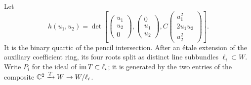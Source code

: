 Let
\begin{equation}\label{eq:binary-h}
 h(u_1,u_2)=\det\left[
 \begin{pmatrix}u_1\\u_2\\0\end{pmatrix},
 \begin{pmatrix}0\\u_1\\u_2\end{pmatrix},
 C\begin{pmatrix}u_1^2\\2u_1u_2\\u_2^2\end{pmatrix}\right].
\end{equation}
It is the binary quartic of the pencil intersection. After an \'etale
extension of the auxiliary coefficient ring, its four roots split as
distinct line subbundles $\ell_i\subset W$. Write $P_i$ for the
ideal of $\operatorname{im} T\subset\ell_i$; it is generated by the two entries
of the composite $\mathbb C^2\xrightarrow{T}W\to W/\ell_i$.


